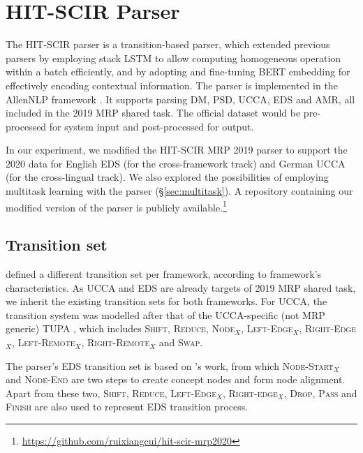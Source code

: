 \documentclass[11pt,a4paper]{article}
\begin{document}
\section{HIT-SCIR Parser}\label{sec:hit-scir}
The HIT-SCIR parser \citep{che-etal-2019-hit} is a transition-based parser, which extended previous parsers by employing stack LSTM \cite{dyer2015transition} to allow computing homogeneous operation within a batch efficiently, and by adopting and fine-tuning BERT \citep{devlin-etal-2019-bert} embedding for effectively encoding contextual information.
The parser is implemented in the AllenNLP framework \cite{Gardner2017AllenNLP}.
It supports parsing DM, PSD, UCCA, EDS and AMR, all included in the 2019 MRP shared task. The official dataset would be pre-processed for system input and post-processed for output.

In our experiment, we modified the HIT-SCIR MRP 2019 parser to support the 2020 data for English EDS (for the cross-framework track) and German UCCA (for the cross-lingual track). We also explored the possibilities of employing multitask learning with the parser (\S\ref{sec:multitask}).  A repository containing our modified version of the parser is publicly available.\footnote{\url{https://github.com/ruixiangcui/hit-scir-mrp2020}}

\subsection{Transition set}\label{sec:hit-scir-transitions}

 defined a different transition set per framework, according to framework's characteristics. 
As UCCA and EDS are already targets of 2019  MRP shared task, we inherit the existing transition sets for both frameworks. For UCCA, the transition system was modelled after that of the UCCA-specific (not MRP generic) TUPA \cite{hershcovich2017a}, which includes \textsc{Shift}, \textsc{Reduce}, \textsc{Node$_X$}, \textsc{Left-Edge$_X$}, \textsc{Right-Edge$_X$}, \textsc{Left-Remote$_X$}, \textsc{Right-Remote$_X$} and \textsc{Swap}.

The parser's EDS transition set is based on \citet{buys-blunsom-2017-robust}'s work, from which \textsc{Node-Start$_X$} and \textsc{Node-End} are two steps to create concept nodes and form node alignment. Apart from these two, \textsc{Shift}, \textsc{Reduce}, \textsc{Left-Edge$_X$}, \textsc{Right-edge$_X$}, \textsc{Drop}, \textsc{Pass} and \textsc{Finish} are also used to represent EDS transition process.
\end{document}
